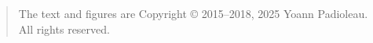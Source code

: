 \begin{quote}
The text and figures are Copyright \copyright{} 2015--2018, 2025 Yoann Padioleau.\\
All rights reserved.
\end{quote}


